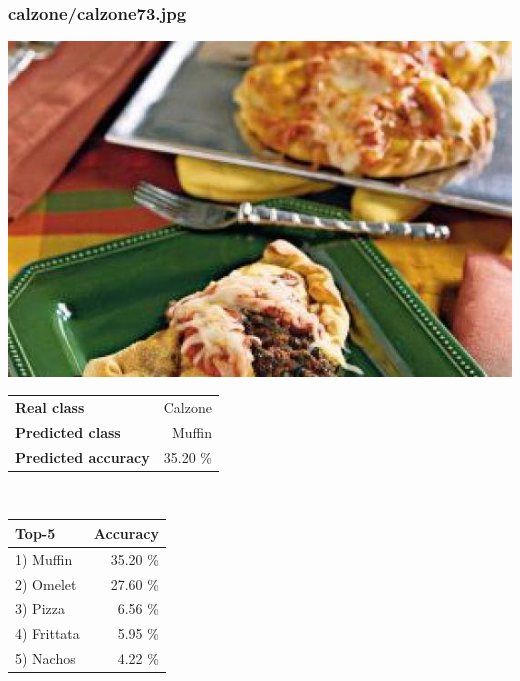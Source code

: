 \subsubsection{calzone/calzone73.jpg}

\begin{minipage}[t]{0.4\textwidth}
	\vspace{0pt}
	\includegraphics[width=\linewidth]{images/evaluation-images/calzone/calzone73.jpg}
\end{minipage}
\hfill
\begin{minipage}[t]{0.5\textwidth}
	\vspace{0pt}\raggedright
	\begin{tabularx}{\textwidth}{X r}
		\small \textbf{Real class} & \small Calzone\\
		\small \textbf{Predicted class} & \small Muffin\\
		\small \textbf{Predicted accuracy} & \small 35.20 \%
    \end{tabularx}\\
    
    \vspace{6pt}
	\begin{tabularx}{\textwidth}{X r}
        \small \textbf{Top-5} & \small \textbf{Accuracy} \\
        \hline
		\small 1) Muffin & \small 35.20 \%\\\small 2) Omelet & \small 27.60 \%\\\small 3) Pizza & \small 6.56 \%\\\small 4) Frittata & \small 5.95 \%\\\small 5) Nachos & \small 4.22 \%
    \end{tabularx}
\end{minipage}
    
